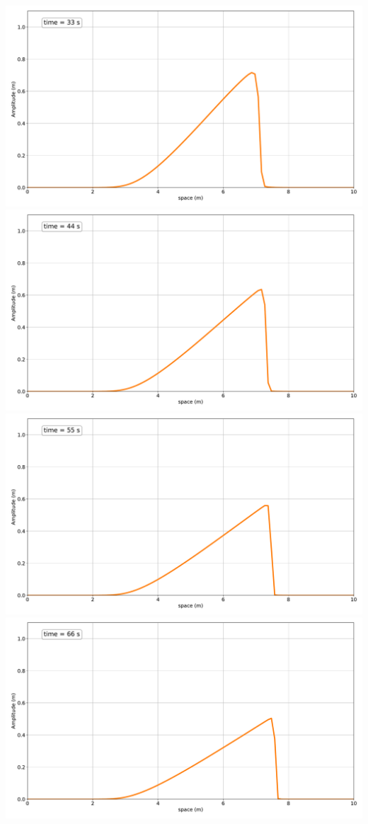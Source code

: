 \includegraphics[width=\linewidth]{../BurgersEquation/images/Nonlinear_Convection3.pdf}
\includegraphics[width=\linewidth]{../BurgersEquation/images/Nonlinear_Convection4.pdf}
\includegraphics[width=\linewidth]{../BurgersEquation/images/Nonlinear_Convection5.pdf}
\includegraphics[width=\linewidth]{../BurgersEquation/images/Nonlinear_Convection6.pdf}
